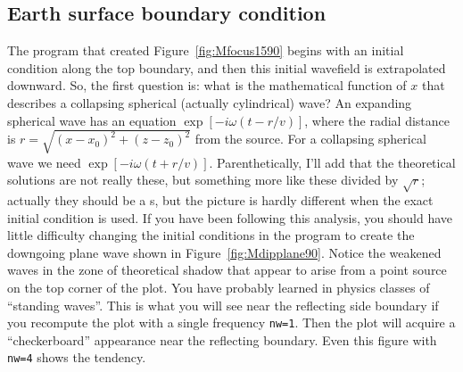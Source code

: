 \subsection{Earth surface boundary condition}
The program that created Figure~\ref{fig:Mfocus1590} begins with
an initial condition along the top boundary,
and then this initial wavefield is extrapolated downward.
So, the first question is: what is the mathematical function of $x$
that describes a collapsing spherical (actually cylindrical) wave?
An expanding spherical wave has an equation $\exp[-i\omega (t - r/v)]$,
where the radial distance is
$r=\sqrt{(x-x_0)^2+(z-z_0)^2}$ from the source.
For a collapsing spherical wave we need $\exp[-i\omega (t + r/v)]$.
Parenthetically, I'll add that 
the theoretical solutions are not really these,
but something more like these divided by $\sqrt{r}$;
actually they should be a s,
but the picture is hardly different
when the exact initial condition is used.
If you have been following this analysis,
you should have little difficulty changing
the initial conditions in the program
to create the downgoing plane wave
shown in Figure~\ref{fig:Mdipplane90}.
Notice the weakened waves in the zone of theoretical shadow
that appear to arise from a point source on the top corner of the plot.
You have probably learned in physics classes of ``standing waves''.
This is what you will see near the reflecting side boundary
if you recompute the plot with a single frequency {\tt nw=1}.
Then the plot will acquire a ``checkerboard'' appearance
near the reflecting boundary.
Even this figure with {\tt nw=4} shows the tendency.
